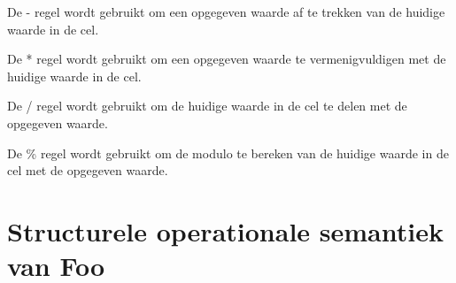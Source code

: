 \documentclass[11pt]{article}
\begin{document}
\begin{prooftree}
\end{prooftree}

De - regel wordt gebruikt om een opgegeven waarde af te trekken van de huidige waarde in de cel.
\begin{prooftree}
\end{prooftree}

\begin{prooftree}
\end{prooftree}

De * regel wordt gebruikt om een opgegeven waarde te vermenigvuldigen met de huidige waarde in de cel.
\begin{prooftree}
\end{prooftree}

\begin{prooftree}
\end{prooftree}

De / regel wordt gebruikt om de huidige waarde in de cel te delen met de opgegeven waarde.
\begin{prooftree}
\end{prooftree}

\begin{prooftree}
\end{prooftree}

De \% regel wordt gebruikt om de modulo te bereken van de huidige waarde in de cel met de opgegeven waarde.
\begin{prooftree}
\end{prooftree}

\begin{prooftree}
\end{prooftree}


\section{Structurele operationale semantiek van Foo}

%
\end{document}
